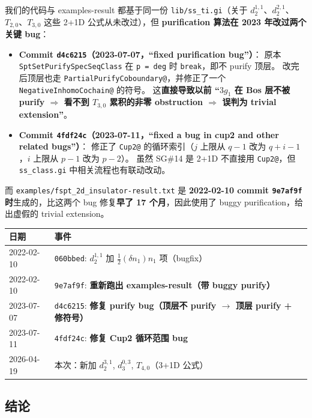 \documentclass[a4paper,fontset=ubuntu,12pt]{ctexart}
\begin{document}
我们的代码与 examples-result 都基于同一份 \texttt{lib/ss\_ti.gi}（关于 $d_2^{1, 1}$、$d_2^{2, 1}$、$T_{2,0}$、$T_{3,0}$ 这些 2+1D 公式从未改过），但 \textbf{purification 算法在 2023 年改过两个关键 bug}：
\begin{itemize}
\item \textbf{Commit \texttt{d4c6215}（2023-07-07，``fixed purification bug''）}：
  原本 \texttt{SptSetPurifySpecSeqClass} 在 \texttt{p = deg} 时 \texttt{break}，即不 purify 顶层。
  改完后顶层也走 \texttt{PartialPurifyCoboundary@}，并修正了一个 \texttt{NegativeInhomoCochain@} 的符号。
  这\textbf{直接导致以前 ``$3 g_1$ 在 Bos 层不被 purify $\Rightarrow$ 看不到 $T_{3, 0}$ 累积的非零 obstruction $\Rightarrow$ 误判为 trivial extension''}。
\item \textbf{Commit \texttt{4fdf24c}（2023-07-11，``fixed a bug in cup2 and other related bugs''）}：
  修正了 \texttt{Cup2@} 的循环索引（$j$ 上限从 $q-1$ 改为 $q+i-1$，$i$ 上限从 $p-1$ 改为 $p-2$）。
  虽然 SG\#14 是 2+1D 不直接用 \texttt{Cup2@}，但 \texttt{ss\_class.gi} 中相关流程也有联动改动。
\end{itemize}

而 \texttt{examples/fspt\_2d\_insulator-result.txt} 是 \textbf{2022-02-10 commit \texttt{9e7af9f} 时}生成的，比这两个 bug 修复\textbf{早了 17 个月}，因此使用了 buggy purification，给出虚假的 trivial extension。

\begin{center}
\begin{tabular}{l|l}
\hline
日期 & 事件 \\
\hline
2022-02-10 & \texttt{060bbed}: $d_2^{1, 1}$ 加 $\frac{1}{2}(\delta n_1) n_1$ 项（bugfix） \\
2022-02-10 & \texttt{9e7af9f}: \textbf{重新跑出 examples-result（带 buggy purify）} \\
2023-07-07 & \texttt{d4c6215}: \textbf{修复 purify bug（顶层不 purify $\to$ 顶层 purify + 修符号）} \\
2023-07-11 & \texttt{4fdf24c}: \textbf{修复 Cup2 循环范围 bug} \\
2026-04-19 & 本次：新加 $d_2^{3,1}$, $d_3^{0, 3}$, $T_{4, 0}$（3+1D 公式） \\
\hline
\end{tabular}
\end{center}

\subsection{结论}
\end{document}

